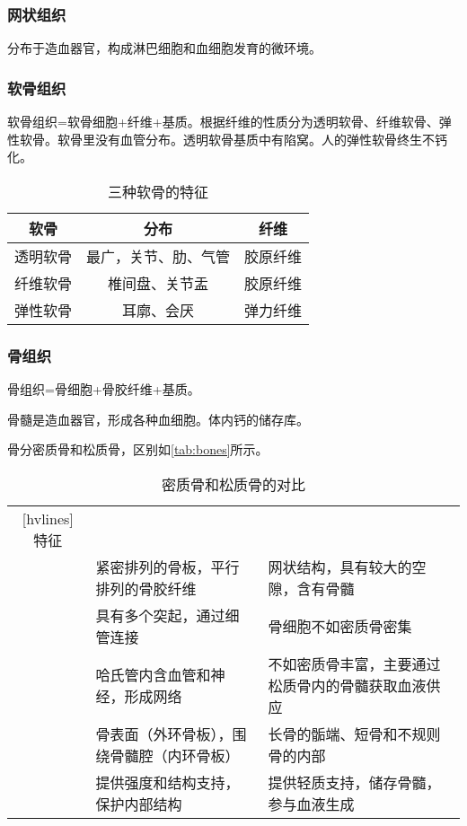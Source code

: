 \subsubsection{网状组织}

分布于造血器官，构成淋巴细胞和血细胞发育的微环境。

\subsubsection{软骨组织}

软骨组织=软骨细胞+纤维+基质。根据纤维的性质分为透明软骨、纤维软骨、弹性软骨。软骨里没有血管分布。透明软骨基质中有陷窝。人的弹性软骨终生不钙化。

\begin{table}[h!]
	\centering
	\begin{tabularx}{\textwidth}{|c|C|c|}
		\hline
		软骨 & 分布 & 纤维 \\ \hline
		透明软骨 & 最广，关节、肋、气管 & 胶原纤维 \\ \hline
		纤维软骨 & 椎间盘、关节盂 & 胶原纤维 \\ \hline
		弹性软骨 & 耳廓、会厌 & 弹力纤维 \\ \hline
	\end{tabularx}
	\caption{三种软骨的特征}
	\label{tab:3Cartilage}
\end{table}


\subsubsection{骨组织}

骨组织=骨细胞+骨胶纤维+基质。

骨髓是造血器官，形成各种血细胞。体内钙的储存库。

骨分密质骨和松质骨，区别如\autoref{tab:bones}所示。

\begin{table}[htbp]
	\centering
	\begin{NiceTabularX}{\textwidth}{cXX}[hvlines]
		特征 &  &  \\
		 & 紧密排列的骨板，平行排列的骨胶纤维 & 网状结构，具有较大的空隙，含有骨髓 \\
		 & 具有多个突起，通过细管连接 & 骨细胞不如密质骨密集 \\
		 & 哈氏管内含血管和神经，形成网络 & 不如密质骨丰富，主要通过松质骨内的骨髓获取血液供应 \\
		 & 骨表面（外环骨板），围绕骨髓腔（内环骨板） & 长骨的骺端、短骨和不规则骨的内部 \\
		 & 提供强度和结构支持，保护内部结构 & 提供轻质支持，储存骨髓，参与血液生成 \\
	\end{NiceTabularX}
	\caption{密质骨和松质骨的对比}
	\label{tab:bones}
\end{table}

